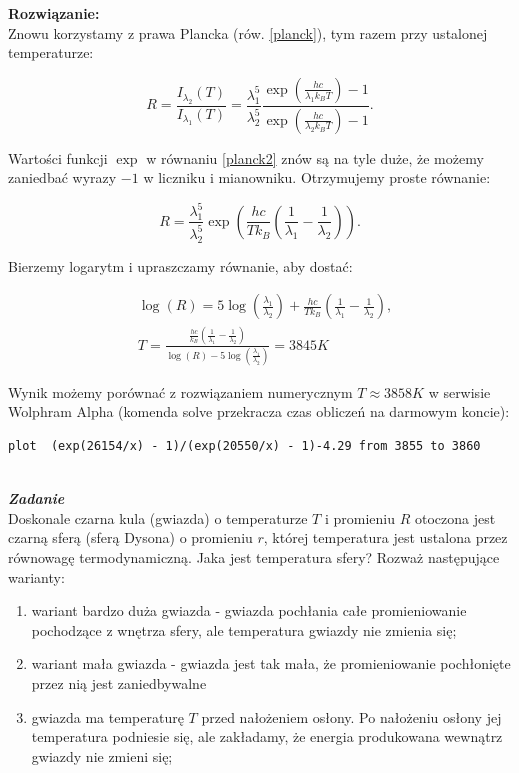 \documentclass[11pt,a4paper]{article}
\newcounter{zadanie}\newcommand{\zadanie}[1][]{\addtocounter{zadanie}{1} ~\\  {\bf \emph{Zadanie \arabic{zadanie} #1 }} \\}
\begin{document}
\vskip 10pt
\textbf{Rozwiązanie:}\\
Znowu korzystamy z prawa Plancka (rów. \eqref{planck}), tym razem przy ustalonej temperaturze:

\begin{equation}
  R = \frac{I_{\lambda_2}(T)}{I_{\lambda_1}(T)} =
  \frac{\lambda_1^5}{\lambda_2^5}
  \frac{\exp\left(\frac{h c}{\lambda_1 k_B T}\right)-1}{\exp\left(\frac{h c}{\lambda_2 k_B T}\right)-1}. \label{planck2}
\end{equation}

Wartości funkcji $\exp$ w równaniu \eqref{planck2} znów są na tyle duże, że możemy zaniedbać
wyrazy $-1$ w liczniku i mianowniku. Otrzymujemy proste równanie:

\begin{equation}
R = \frac{\lambda_1^5}{\lambda_2^5} \exp\left(\frac{h c}{T k_B}\left( \frac{1}{\lambda_1}-\frac{1}{\lambda_2}\right)\right).
\end{equation}

Bierzemy logarytm i upraszczamy równanie, aby dostać:

\begin{align}
&\log(R) = 5 \log\left(\frac{\lambda_1}{\lambda_2}\right) + \frac{h c}{T k_B}\left( \frac{1}{\lambda_1}-\frac{1}{\lambda_2}\right),\\
  &T = \frac{\frac{h c}{k_B}\left( \frac{1}{\lambda_1}-
    \frac{1}{\lambda_2}\right)}{\log(R)-5 \log\left(\frac{\lambda_1}{\lambda_2}\right)} =  3845K
\end{align}

Wynik możemy porównać z rozwiązaniem numerycznym $T \approx 3858K$ w serwisie Wolphram Alpha
(komenda solve przekracza czas obliczeń na darmowym koncie):
\begin{verbatim}
plot  (exp(26154/x) - 1)/(exp(20550/x) - 1)-4.29 from 3855 to 3860
\end{verbatim}

\newpage

\vskip 10pt
\zadanie
Doskonale czarna kula (gwiazda) o temperaturze $T$ i promieniu $R$ otoczona jest
czarną sferą (sferą Dysona) o promieniu $r$, której temperatura jest ustalona
przez równowagę termodynamiczną. Jaka jest temperatura sfery? Rozważ następujące warianty:
\begin{enumerate}
\item wariant bardzo duża gwiazda - gwiazda pochłania całe promieniowanie pochodzące z wnętrza sfery,
      ale temperatura gwiazdy nie zmienia się;
\item wariant mała gwiazda - gwiazda jest tak mała, że promieniowanie pochłonięte przez nią jest zaniedbywalne
\item gwiazda ma temperaturę $T$ przed nałożeniem osłony. Po nałożeniu osłony jej temperatura podniesie się,
      ale zakładamy, że energia produkowana wewnątrz gwiazdy nie zmieni się;  
\end{enumerate}
\end{document}
